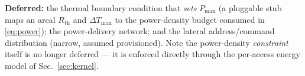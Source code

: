 \documentclass[11pt]{article}
\newcommand{\Pmax}{P_{\max}}
\begin{document}
\medskip\noindent
\textbf{Deferred:} the thermal boundary condition that \emph{sets} $\Pmax$ (a
pluggable stub maps an areal $R_{\mathrm{th}}$ and $\Delta T_{\max}$ to the
power-density budget consumed in \eqref{eq:power}); the power-delivery network;
and the lateral address/command distribution (narrow, assumed provisioned). Note
the power-density \emph{constraint} itself is no longer deferred --- it is
enforced directly through the per-access energy model of Sec.~\ref{sec:kernel}.
\end{document}
